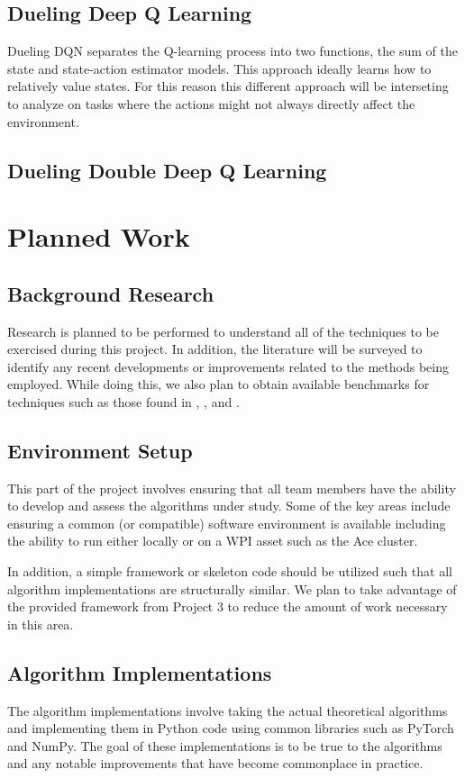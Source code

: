 \documentclass[conference]{IEEEtran}
\begin{document}
\subsection{Dueling Deep Q Learning}
Dueling DQN separates the Q-learning process into two functions, the sum of the state and state-action estimator models. This approach ideally learns how to relatively value states. For this reason this different approach will be interseting to analyze on tasks where the actions might not always directly affect the environment.

\subsection{Dueling Double Deep Q Learning}

\section{Planned Work}

\subsection{Background Research}
Research is planned to be performed to understand all of the techniques to be exercised during this project.
In addition, the literature will be surveyed to identify any recent developments or improvements related to the methods being employed.
While doing this, we also plan to obtain available benchmarks for techniques such as those found in \cite{DQNOriginalPaper}, \cite{NatureDeepLearning}, and \cite{bhonker2017playing}.

\subsection{Environment Setup}
This part of the project involves ensuring that all team members have the ability to develop and assess the algorithms under study.
Some of the key areas include ensuring a common (or compatible) software environment is available including the ability to run \cite{nichol2018retro} either locally or on a WPI asset such as the Ace cluster.

In addition, a simple framework or skeleton code should be utilized such that all algorithm implementations are structurally similar.
We plan to take advantage of the provided framework from Project 3 to reduce the amount of work necessary in this area.

\subsection{Algorithm Implementations}
The algorithm implementations involve taking the actual theoretical algorithms and implementing them in Python code using common libraries such as PyTorch and NumPy.
The goal of these implementations is to be true to the algorithms and any notable improvements that have become commonplace in practice.
\end{document}
